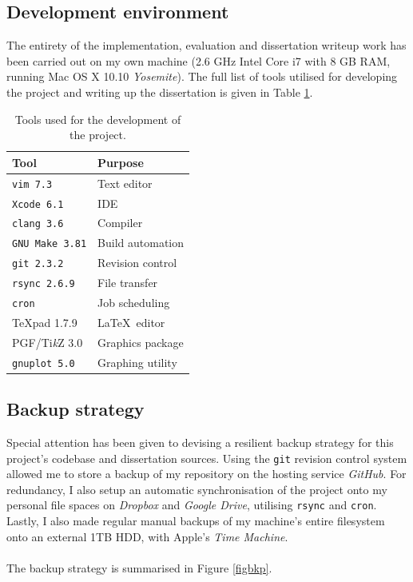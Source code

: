 \documentclass[12pt,a4paper,twoside,openright]{report}
\begin{document}
\subsection{Development environment}
The entirety of the implementation, evaluation and dissertation writeup work has been carried out on my own machine (2.6 GHz Intel Core i7 with 8 GB RAM, running Mac OS X 10.10 \emph{Yosemite}). The full list of tools utilised for developing the project and writing up the dissertation is given in Table \ref{tbldevtools}. 
\begin{table}[H]\centering
\begin{tabular}{ l  l } \toprule
{\bf Tool} & {\bf Purpose}\\ \midrule
{\tt vim 7.3} & Text editor\\
{\tt Xcode 6.1} & IDE\\
{\tt clang 3.6} & Compiler\\
{\tt GNU Make 3.81} & Build automation\\
{\tt git 2.3.2} & Revision control\\
{\tt rsync 2.6.9} & File transfer\\
{\tt cron} & Job scheduling\\
\TeX pad 1.7.9 & \LaTeX\ editor\\
PGF/Ti{\it k}Z 3.0 & Graphics package\\
{\tt gnuplot 5.0} & Graphing utility\\
\bottomrule
\end{tabular}
\caption{Tools used for the development of the project.}\label{tbldevtools}
\end{table}

\subsection{Backup strategy}

Special attention has been given to devising a resilient backup strategy for this project's codebase and dissertation sources. Using the \texttt{git} revision control system allowed me to store a backup of my repository on the hosting service \emph{GitHub}. For redundancy, I also setup an automatic synchronisation of the project onto my personal file spaces on \emph{Dropbox} and \emph{Google Drive}, utilising \texttt{rsync} and \texttt{cron}. Lastly, I also made regular manual backups of my machine's entire filesystem onto an external 1TB HDD, with Apple's \emph{Time Machine}.\\ \\ The backup strategy is summarised in Figure \ref{figbkp}.
\end{document}
